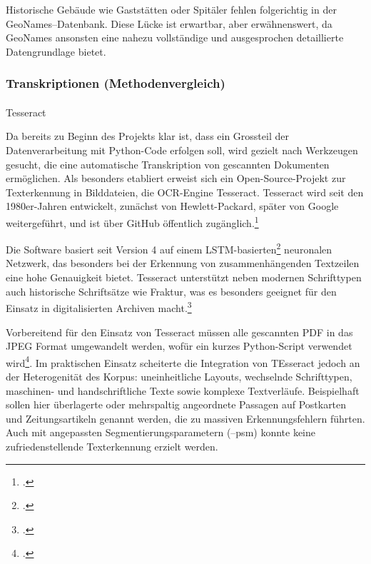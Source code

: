 \documentclass[12pt, a4paper, ngerman, bidi=default]{article}
\makeatletter
\let\cite\footcite
\let\oldparagraph\paragraph%
\renewcommand{\paragraph}{
    \@ifstar%
      \xxxParagraphStar%
      \xxxParagraphNoStar%
 }
\newcommand{\xxxParagraphStar}[1]{\oldparagraph*{#1}\mbox{}}
\newcommand{\xxxParagraphNoStar}[1]{\oldparagraph{#1}\mbox{}}
\makeatother
\begin{document}
Historische Gebäude wie Gaststätten oder Spitäler fehlen folgerichtig in der GeoNames–Datenbank. Diese Lücke ist erwartbar, aber erwähnenswert, da GeoNames 
ansonsten eine nahezu vollständige und ausgesprochen detaillierte Datengrundlage bietet.

\subsubsection{Transkriptionen (Methodenvergleich)}\label{section:Transkriptionen_Methoden}
\paragraph{Tesseract}\label{paragraph:Tesseract}

Da bereits zu Beginn des Projekts klar ist, dass ein Grossteil der Datenverarbeitung mit Python-Code erfolgen soll, wird gezielt 
nach Werkzeugen gesucht, die eine automatische Transkription von gescannten Dokumenten ermöglichen. 
Als besonders etabliert erweist sich ein Open-Source-Projekt zur Texterkennung in Bilddateien, die OCR-Engine Tesseract. 
Tesseract wird seit den 1980er-Jahren entwickelt, zunächst von Hewlett-Packard, später von Google weitergeführt, 
und ist über GitHub öffentlich zugänglich.\cite[vgl.][]{weil_tesseract-ocrtesseract_2025}

Die Software basiert seit Version 4 auf einem LSTM-basierten\cite[Abk.: \textbf{LSTM} steht für \textit{Long Short-Term Memory};  Architektur der frühen Generation rekurrenter neuronaler Netzwerke \textit{RNNs}. LSTMs wurden entwickelt, um Sequenzdaten zu verarbeiten und dabei sowohl kurzfristige als auch langfristige Abhängigkeiten in der Datenfolge zu erfassen – ein typisches Beispiel sind Texte, Sprache, Zeitreihen oder Handschrift. ;vgl.][p.1-2]{beck_review_2020} neuronalen Netzwerk, das besonders bei der Erkennung von zusammenhängenden Textzeilen eine 
hohe Genauigkeit bietet. Tesseract unterstützt neben modernen Schrifttypen auch historische Schriftsätze wie Fraktur, was es besonders geeignet 
für den Einsatz in digitalisierten Archiven macht.\cite[vgl.][]{weil_tesseract-ocrtesseract_2025}

Vorbereitend für den Einsatz von Tesseract müssen alle gescannten PDF in das JPEG Format umgewandelt werden, wofür ein kurzes Python-Script verwendet wird\cite[vgl.][]{burkhardt_githubpdf_to_jpegpy_2025}. 
Im praktischen Einsatz scheiterte die Integration von TEsseract jedoch an der Heterogenität des Korpus: uneinheitliche Layouts, wechselnde 
Schrifttypen, maschinen- und handschriftliche Texte sowie komplexe Textverläufe. Beispielhaft sollen hier überlagerte oder mehrspaltig angeordnete 
Passagen auf Postkarten und Zeitungsartikeln genannt werden, die zu massiven Erkennungsfehlern führten. Auch mit angepassten Segmentierungsparametern (--psm) 
konnte keine zufriedenstellende Texterkennung erzielt werden.
\end{document}
